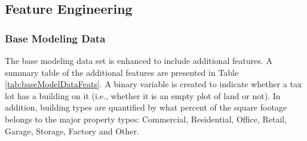 \documentclass[12pt,]{article}
\begin{document}
\hypertarget{feature-engineering}{%
\subsection{Feature Engineering}\label{feature-engineering}}

\hypertarget{base-modeling-data}{%
\subsubsection{Base Modeling Data}\label{base-modeling-data}}

The base modeling data set is enhanced to include additional features. A
summary table of the additional features are presented in Table
\ref{tab:baseModelDataFeats}. A binary variable is created to indicate
whether a tax lot has a building on it (i.e., whether it is an empty
plot of land or not). In addition, building types are quantified by what
percent of the square footage belongs to the major property types:
Commercial, Residential, Office, Retail, Garage, Storage, Factory and
Other.
\end{document}
